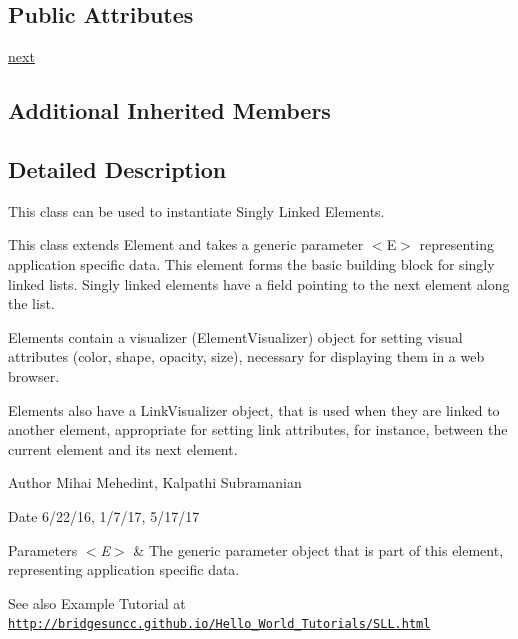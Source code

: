 \subsection*{Public Attributes}
\begin{DoxyCompactItemize}
\item 
\hyperlink{classbridges_1_1sl__element_1_1_s_lelement_a4fa8e9321dd2ce726da047ddc64adabf}{next}
\end{DoxyCompactItemize}
\subsection*{Additional Inherited Members}


\subsection{Detailed Description}
This class can be used to instantiate Singly Linked Elements. 

This class extends Element and takes a generic parameter $<$\+E$>$ representing application specific data. This element forms the basic building block for singly linked lists. Singly linked elements have a field pointing to the next element along the list.

\begin{DoxyVerb}Elements contain a visualizer (ElementVisualizer) object for setting visual
attributes (color, shape, opacity, size), necessary for displaying them in a
web browser.

Elements also have a LinkVisualizer object, that is used when they are linked to
another element, appropriate for setting link attributes, for instance, between
the current element and its next element.
\end{DoxyVerb}


\begin{DoxyAuthor}{Author}
Mihai Mehedint, Kalpathi Subramanian
\end{DoxyAuthor}
\begin{DoxyDate}{Date}
6/22/16, 1/7/17, 5/17/17
\end{DoxyDate}

\begin{DoxyParams}{Parameters}
{\em $<$\+E$>$} & The generic parameter object that is part of this element, representing application specific data.\\
\hline
\end{DoxyParams}
\begin{DoxySeeAlso}{See also}
Example Tutorial at ~\newline
 \href{http://bridgesuncc.github.io/Hello_World_Tutorials/SLL.html}{\tt http\+://bridgesuncc.\+github.\+io/\+Hello\+\_\+\+World\+\_\+\+Tutorials/\+S\+L\+L.\+html} 
\end{DoxySeeAlso}


